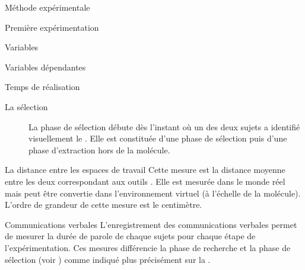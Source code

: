 \documentclass[myfrancais]{mythesis}
\begin{document}
\begin{mychapter}{Méthode expérimentale}
\begin{mysection}{Première expérimentation}
\begin{mysubsection}{Variables}
\begin{mysubsubsection}{Variables dépendantes}
\begin{myparagraph}{ Temps de réalisation}
\begin{description}
							\item[La sélection] La phase de sélection débute dès l'instant où un des deux sujets a identifié visuellement le .
								Elle est constituée d'une phase de sélection puis d'une phase d'extraction hors de la molécule.
						\end{description}
					\end{myparagraph}
					\begin{myparagraph}{ La distance entre les espaces de travail}
						Cette mesure est la distance moyenne entre les deux  correspondant aux outils .
						Elle est mesurée dans le monde réel mais peut être convertie dans l'environnement virtuel (à l'échelle de la molécule).
						L'ordre de grandeur de cette mesure est le centimètre.
					\end{myparagraph}
					\begin{myparagraph}{ Communications verbales}
						L'enregistrement des communications verbales permet de mesurer la durée de parole de chaque sujets pour chaque étape de l'expérimentation.
						Ces mesures différencie la phase de recherche et la phase de sélection (voir ) comme indiqué plus précisément sur la .


\end{myparagraph}
\end{mysubsubsection}
\end{mysubsection}
\end{mysection}
\end{mychapter}
\end{document}

